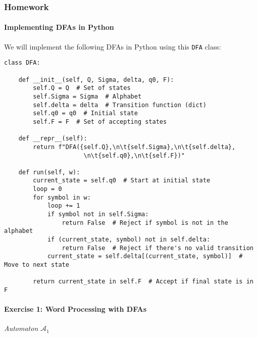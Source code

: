 \documentclass{article}
\theoremstyle{theorem}
\theoremstyle{definition}
\theoremstyle{remark}
\begin{document}
\subsubsection{Homework}

\paragraph*{Implementing DFAs in Python}
We will implement the following DFAs in Python using this \texttt{DFA} class:

\begin{verbatim}
class DFA:

    def __init__(self, Q, Sigma, delta, q0, F):
        self.Q = Q  # Set of states
        self.Sigma = Sigma  # Alphabet
        self.delta = delta  # Transition function (dict)
        self.q0 = q0  # Initial state
        self.F = F  # Set of accepting states

    def __repr__(self):
        return f"DFA({self.Q},\n\t{self.Sigma},\n\t{self.delta},
                      \n\t{self.q0},\n\t{self.F})"

    def run(self, w):
        current_state = self.q0  # Start at initial state
        loop = 0
        for symbol in w:
            loop += 1
            if symbol not in self.Sigma:
                return False  # Reject if symbol is not in the alphabet
            if (current_state, symbol) not in self.delta:
                return False  # Reject if there's no valid transition
            current_state = self.delta[(current_state, symbol)]  # Move to next state
        
        return current_state in self.F  # Accept if final state is in F
\end{verbatim}

\newpage

\paragraph*{Exercise 1: Word Processing with DFAs}
\begin{center}

\textit{Automaton \(\mathcal{A}_1\)}
\end{center}
\end{document}
